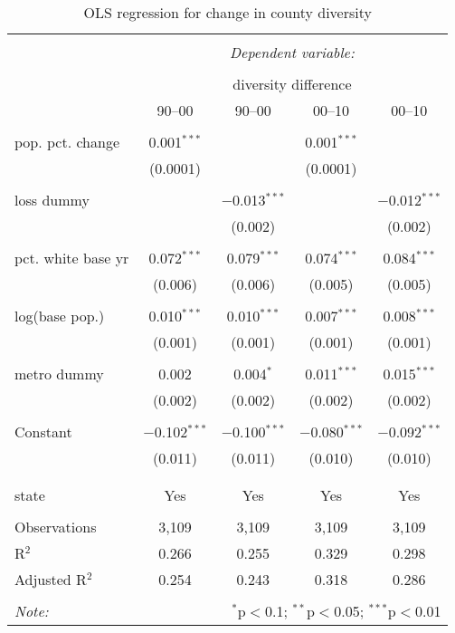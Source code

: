 
\begin{table}[p] \centering 
  \caption{OLS regression for change in county diversity} 
  \label{} 
\begin{tabular}{@{\extracolsep{5pt}}lcccc} 
\\[-1.8ex]\hline 
\hline \\[-1.8ex] 
 & \multicolumn{4}{c}{\textit{Dependent variable:}} \\ 
\cline{2-5} 
\\[-1.8ex] & \multicolumn{4}{c}{diversity difference} \\ 
 & 90--00 & 90--00 & 00--10 & 00--10 \\ 
\hline \\[-1.8ex] 
 pop. pct. change & 0.001$^{***}$ &  & 0.001$^{***}$ &  \\ 
  & (0.0001) &  & (0.0001) &  \\ 
  & & & & \\ 
 loss dummy &  & $-$0.013$^{***}$ &  & $-$0.012$^{***}$ \\ 
  &  & (0.002) &  & (0.002) \\ 
  & & & & \\ 
 pct. white base yr & 0.072$^{***}$ & 0.079$^{***}$ & 0.074$^{***}$ & 0.084$^{***}$ \\ 
  & (0.006) & (0.006) & (0.005) & (0.005) \\ 
  & & & & \\ 
 log(base pop.) & 0.010$^{***}$ & 0.010$^{***}$ & 0.007$^{***}$ & 0.008$^{***}$ \\ 
  & (0.001) & (0.001) & (0.001) & (0.001) \\ 
  & & & & \\ 
 metro dummy & 0.002 & 0.004$^{*}$ & 0.011$^{***}$ & 0.015$^{***}$ \\ 
  & (0.002) & (0.002) & (0.002) & (0.002) \\ 
  & & & & \\ 
 Constant & $-$0.102$^{***}$ & $-$0.100$^{***}$ & $-$0.080$^{***}$ & $-$0.092$^{***}$ \\ 
  & (0.011) & (0.011) & (0.010) & (0.010) \\ 
  & & & & \\ 
\hline \\[-1.8ex] 
state & Yes & Yes & Yes & Yes \\ 
\hline \\[-1.8ex] 
Observations & 3,109 & 3,109 & 3,109 & 3,109 \\ 
R$^{2}$ & 0.266 & 0.255 & 0.329 & 0.298 \\ 
Adjusted R$^{2}$ & 0.254 & 0.243 & 0.318 & 0.286 \\ 
\hline 
\hline \\[-1.8ex] 
\textit{Note:}  & \multicolumn{4}{r}{$^{*}$p$<$0.1; $^{**}$p$<$0.05; $^{***}$p$<$0.01} \\ 
\end{tabular} 
\end{table} 
